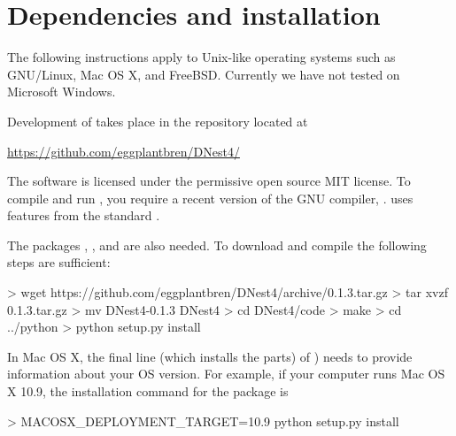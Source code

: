 \documentclass[article, nojss]{jss}
\begin{document}






\section{Dependencies and installation}\label{sec:installation}
The following instructions apply to Unix-like operating systems such as
GNU/Linux, Mac OS X, and FreeBSD. Currently we have not tested
 on Microsoft Windows.

Development of  takes place in the  repository located at
\begin{center}
\url{https://github.com/eggplantbren/DNest4/}
\end{center}
The software
is licensed under the permissive open source
MIT license. To compile and run ,
you require a recent version of the GNU
 compiler,  \citep{gcc}.
 uses features from the  standard
\citep{c++11}.

The 
packages  \citep{numpy},  \citep{matplotlib},
and  \citep{cython} are also needed.
To download and compile 
the following steps are sufficient:
\begin{CodeChunk}
\begin{CodeInput}
> wget https://github.com/eggplantbren/DNest4/archive/0.1.3.tar.gz
> tar xvzf 0.1.3.tar.gz
> mv DNest4-0.1.3 DNest4
> cd DNest4/code
> make
> cd ../python
> python setup.py install
\end{CodeInput}
\end{CodeChunk}

In Mac OS X, the final line (which installs the  parts)
of )
needs to provide information about
your OS version. For example, if your computer runs Mac OS X 10.9,
the installation command for the  package is
\begin{CodeChunk}
\begin{CodeInput}
> MACOSX_DEPLOYMENT_TARGET=10.9 python setup.py install
\end{CodeInput}
\end{CodeChunk}
\end{document}
